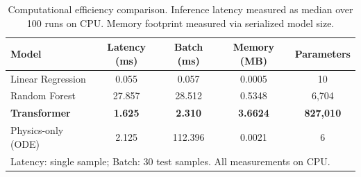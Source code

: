 
\begin{table}[t]
\centering
\caption{Computational efficiency comparison. Inference latency measured as median over 100 runs on CPU. Memory footprint measured via serialized model size.}
\label{tab:computational_efficiency}
\begin{tabular}{lcccc}
\toprule
\textbf{Model} & \textbf{Latency (ms)} & \textbf{Batch (ms)} & \textbf{Memory (MB)} & \textbf{Parameters} \\
\midrule
Linear Regression & 0.055 & 0.057 & 0.0005 & 10 \\
Random Forest & 27.857 & 28.512 & 0.5348 & 6,704 \\
\textbf{Transformer} & \textbf{1.625} & \textbf{2.310} & \textbf{3.6624} & \textbf{827,010} \\
Physics-only (ODE) & 2.125 & 112.396 & 0.0021 & 6 \\
\bottomrule
\multicolumn{5}{l}{\footnotesize Latency: single sample; Batch: 30 test samples. All measurements on CPU.} \\
\end{tabular}
\end{table}

%
%
%
